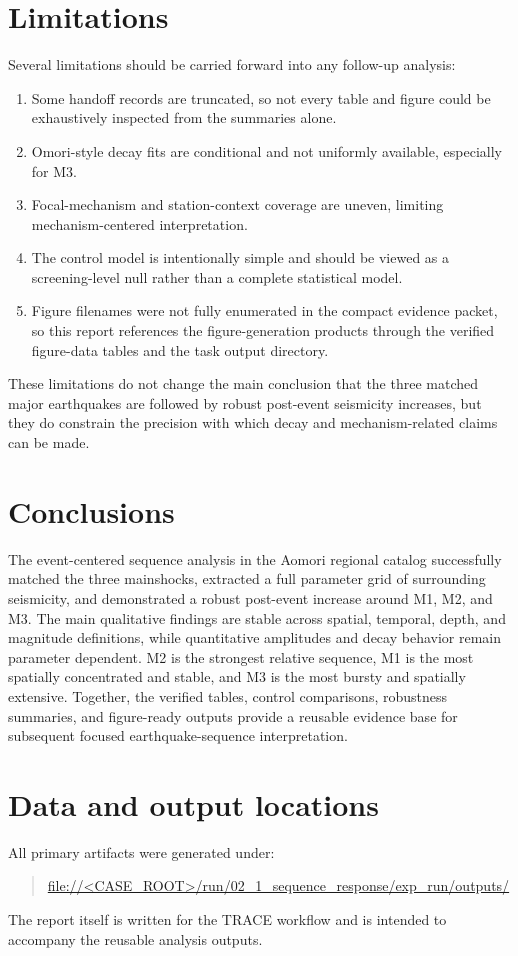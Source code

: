 \documentclass[11pt]{article}
\begin{document}
\section{Limitations}
Several limitations should be carried forward into any follow-up analysis:
\begin{enumerate}[leftmargin=1.2em]
    \item Some handoff records are truncated, so not every table and figure could be exhaustively inspected from the summaries alone.
    \item Omori-style decay fits are conditional and not uniformly available, especially for M3.
    \item Focal-mechanism and station-context coverage are uneven, limiting mechanism-centered interpretation.
    \item The control model is intentionally simple and should be viewed as a screening-level null rather than a complete statistical model.
    \item Figure filenames were not fully enumerated in the compact evidence packet, so this report references the figure-generation products through the verified figure-data tables and the task output directory.
\end{enumerate}

These limitations do not change the main conclusion that the three matched major earthquakes are followed by robust post-event seismicity increases, but they do constrain the precision with which decay and mechanism-related claims can be made.

\section{Conclusions}
The event-centered sequence analysis in the Aomori regional catalog successfully matched the three mainshocks, extracted a full parameter grid of surrounding seismicity, and demonstrated a robust post-event increase around M1, M2, and M3. The main qualitative findings are stable across spatial, temporal, depth, and magnitude definitions, while quantitative amplitudes and decay behavior remain parameter dependent. M2 is the strongest relative sequence, M1 is the most spatially concentrated and stable, and M3 is the most bursty and spatially extensive. Together, the verified tables, control comparisons, robustness summaries, and figure-ready outputs provide a reusable evidence base for subsequent focused earthquake-sequence interpretation.

\section*{Data and output locations}
All primary artifacts were generated under:
\begin{quote}
\url{file://<CASE_ROOT>/run/02_1_sequence_response/exp_run/outputs/}
\end{quote}
The report itself is written for the TRACE workflow and is intended to accompany the reusable analysis outputs.
\end{document}
